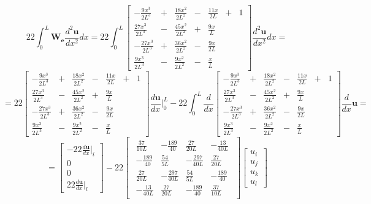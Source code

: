 $$22 \int_0^L \mathbf{W_e} \frac{d^2 \mathbf{u}}{dx^2} dx
=
22\int_0^L
\begin{bmatrix}
	-\frac{9x^3}{2L^3}&+&\frac{18x^2}{2L^2}&-&\frac{11x}{2L} &+& 1\\
	\frac{27x^3}{2L^3}&-&\frac{45x^2}{2L^2}&+&\frac{9x}{L}&&\\
	-\frac{27x^3}{2L^3}&+&\frac{36x^2}{2L^2}&-&\frac{9x}{2L}&&\\
	\frac{9x^3}{2L^3}&-&\frac{9x^2}{2L^2}&-&\frac{x}{L}&&
\end{bmatrix}
\frac{d^2 \mathbf{u}}{dx^2} dx
=
$$
$$
=
22
\begin{bmatrix}
	-\frac{9x^3}{2L^3}&+&\frac{18x^2}{2L^2}&-&\frac{11x}{2L} &+& 1\\
	\frac{27x^3}{2L^3}&-&\frac{45x^2}{2L^2}&+&\frac{9x}{L}&&\\
	-\frac{27x^3}{2L^3}&+&\frac{36x^2}{2L^2}&-&\frac{9x}{2L}&&\\
	\frac{9x^3}{2L^3}&-&\frac{9x^2}{2L^2}&-&\frac{x}{L}&&
\end{bmatrix}
\frac{d\mathbf{u}}{dx} |_0^L
  -22  \int_0^L \frac{d}{dx}
\begin{bmatrix}
	-\frac{9x^3}{2L^3}&+&\frac{18x^2}{2L^2}&-&\frac{11x}{2L} &+& 1\\
	\frac{27x^3}{2L^3}&-&\frac{45x^2}{2L^2}&+&\frac{9x}{L}&&\\
	-\frac{27x^3}{2L^3}&+&\frac{36x^2}{2L^2}&-&\frac{9x}{2L}&&\\
	\frac{9x^3}{2L^3}&-&\frac{9x^2}{2L^2}&-&\frac{x}{L}&&
\end{bmatrix}
\frac{d}{dx} \mathbf{u}
=$$
$$
=
\begin{bmatrix}
	  -22 \frac{d\mathbf{u}}{dx}|_i \\
	0\\
	0\\
22\frac{d\mathbf{u}}{dx}|_l
\end{bmatrix}
  -22 
\begin{bmatrix}
\begin{array}{rrrr}
	\frac{37}{10L} & -\frac{189}{40} & \frac{27}{20L} & -\frac{13}{40L}\\
	-\frac{189}{40} & \frac{54}{5L} & -\frac{297}{40L} & \frac{27}{20L}\\
	\frac{27}{20L} &  -\frac{297}{40L} & \frac{54}{5L} & -\frac{189}{40}\\
	-\frac{13}{40L} & \frac{27}{20L} & -\frac{189}{40} & \frac{37}{10L}
\end{array}
\end{bmatrix}
\begin{bmatrix}
u_i \\
u_j \\
u_k\\
u_l
\end{bmatrix}
$$


